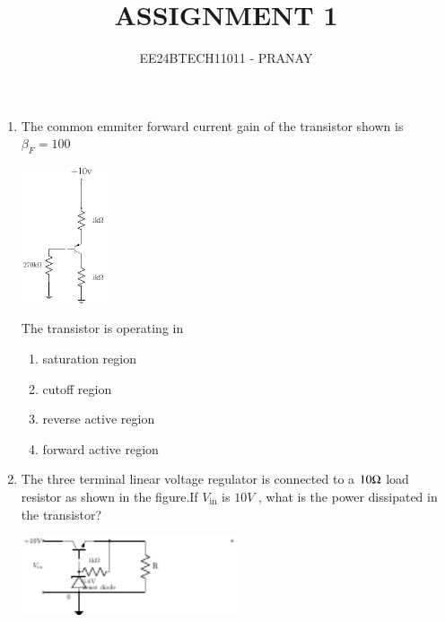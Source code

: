 \documentclass[journal,12pt,onecolumn]{IEEEtran}
\theoremstyle{remark}
\begin{document}

\vspace{3cm}

\title{ASSIGNMENT 1}
\author{EE24BTECH11011 - PRANAY}
\maketitle

\bigskip

\renewcommand{\thefigure}{\theenumi}
\renewcommand{\thetable}{\theenumi}
\begin{enumerate}
    \item The common emmiter forward current gain of the transistor shown is $\beta_F = 100$
	    \begin{center}

\includegraphics[width=0.2\textwidth]{figs/fig1/main} %
\end{center}
The transistor is operating in
 

\begin{enumerate}
    \item saturation region
    \item cutoff region
    \item reverse active region
    \item forward active region\\
\end{enumerate}
    \item The three terminal linear voltage regulator is connected to a $10 \ohm$ load resistor as shown in the figure.If $V_{\text{in}}$ is $10 V$ , what is the power dissipated in the transistor?
	     \begin{center}

\includegraphics[width=0.5\textwidth]{figs/fig2/main} 
\end{center}


\end{enumerate}
\end{document}
